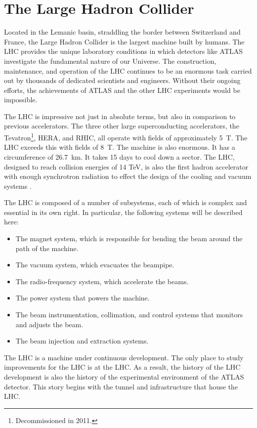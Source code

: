 \section{The Large Hadron Collider}

Located in the Lemanic basin, straddling the border between Switzerland and France, the Large Hadron Collider is the largest machine built by humans.
The LHC provides the unique laboratory conditions in which detectors like ATLAS investigate the fundamental nature of our Universe.
The construction, maintenance, and operation of the LHC continues to be an enormous task carried out by thousands of dedicated scientists and engineers. Without their ongoing efforts, the achievements of ATLAS and the other LHC experiments would be impossible.

The LHC is impressive not just in absolute terms, but also in comparison to previous accelerators.
The three other large superconducting accelerators, the Tevatron\footnote{Decommissioned in 2011.}, HERA, and RHIC, all operate with fields of approximately 5~T. The LHC exceeds this with fields of 8~T.
The machine is also enormous. It has a circumference of 26.7~km. It takes 15 days to cool down a sector.
The LHC, designed to reach collision energies of 14 TeV, is also the first hadron accelerator with enough synchrotron radiation to effect the design of the cooling and vacuum systems \cite{lyndon}.

The LHC is composed of a number of subsystems, each of which is complex and essential in its own right.
In particular, the following systems will be described here:
\begin{itemize}
    \item The magnet system, which is responsible for bending the beam around the path of the machine.
    \item The vacuum system, which evacuates the beampipe.
    \item The radio-frequency system, which accelerate the beams. 
    \item The power system that powers the machine.
    \item The beam instrumentation, collimation, and control systems that monitors and adjusts the beam.
    \item The beam injection and extraction systems.
\end{itemize}
The LHC is a machine under continuous development. The only place to study improvements for the LHC is at the LHC.
As a result, the history of the LHC development is also the history of the experimental environment of the ATLAS detector.
This story begins with the tunnel and infrastructure that house the LHC.

